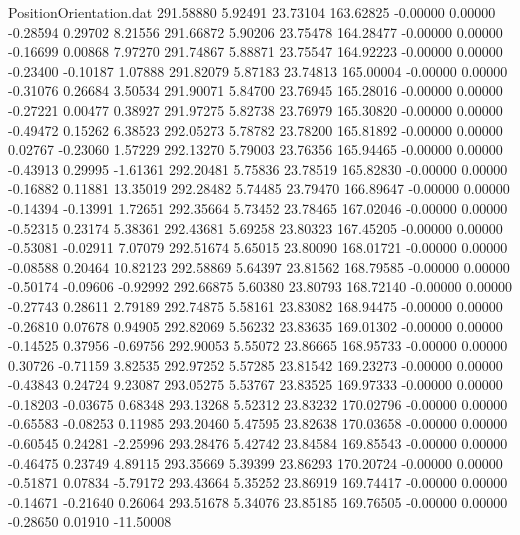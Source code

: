 \begin{filecontents}{PositionOrientation.dat}
 291.58880    5.92491   23.73104   163.62825   -0.00000    0.00000   -0.28594    0.29702    8.21556
 291.66872    5.90206   23.75478   164.28477   -0.00000    0.00000   -0.16699    0.00868    7.97270
 291.74867    5.88871   23.75547   164.92223   -0.00000    0.00000   -0.23400   -0.10187    1.07888
 291.82079    5.87183   23.74813   165.00004   -0.00000    0.00000   -0.31076    0.26684    3.50534
 291.90071    5.84700   23.76945   165.28016   -0.00000    0.00000   -0.27221    0.00477    0.38927
 291.97275    5.82738   23.76979   165.30820   -0.00000    0.00000   -0.49472    0.15262    6.38523
 292.05273    5.78782   23.78200   165.81892   -0.00000    0.00000    0.02767   -0.23060    1.57229
 292.13270    5.79003   23.76356   165.94465   -0.00000    0.00000   -0.43913    0.29995   -1.61361
 292.20481    5.75836   23.78519   165.82830   -0.00000    0.00000   -0.16882    0.11881   13.35019
 292.28482    5.74485   23.79470   166.89647   -0.00000    0.00000   -0.14394   -0.13991    1.72651
 292.35664    5.73452   23.78465   167.02046   -0.00000    0.00000   -0.52315    0.23174    5.38361
 292.43681    5.69258   23.80323   167.45205   -0.00000    0.00000   -0.53081   -0.02911    7.07079
 292.51674    5.65015   23.80090   168.01721   -0.00000    0.00000   -0.08588    0.20464   10.82123
 292.58869    5.64397   23.81562   168.79585   -0.00000    0.00000   -0.50174   -0.09606   -0.92992
 292.66875    5.60380   23.80793   168.72140   -0.00000    0.00000   -0.27743    0.28611    2.79189
 292.74875    5.58161   23.83082   168.94475   -0.00000    0.00000   -0.26810    0.07678    0.94905
 292.82069    5.56232   23.83635   169.01302   -0.00000    0.00000   -0.14525    0.37956   -0.69756
 292.90053    5.55072   23.86665   168.95733   -0.00000    0.00000    0.30726   -0.71159    3.82535
 292.97252    5.57285   23.81542   169.23273   -0.00000    0.00000   -0.43843    0.24724    9.23087
 293.05275    5.53767   23.83525   169.97333   -0.00000    0.00000   -0.18203   -0.03675    0.68348
 293.13268    5.52312   23.83232   170.02796   -0.00000    0.00000   -0.65583   -0.08253    0.11985
 293.20460    5.47595   23.82638   170.03658   -0.00000    0.00000   -0.60545    0.24281   -2.25996
 293.28476    5.42742   23.84584   169.85543   -0.00000    0.00000   -0.46475    0.23749    4.89115
 293.35669    5.39399   23.86293   170.20724   -0.00000    0.00000   -0.51871    0.07834   -5.79172
 293.43664    5.35252   23.86919   169.74417   -0.00000    0.00000   -0.14671   -0.21640    0.26064
 293.51678    5.34076   23.85185   169.76505   -0.00000    0.00000   -0.28650    0.01910  -11.50008

\end{filecontents}
